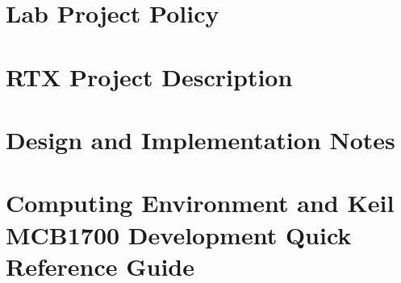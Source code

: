 \mainmatter

\part{Lab Project Policy}
\label{part_policy}


\part{RTX Project Description}
\label{part_proj_description}


\part{Design and Implementation Notes}
\label{part_faq}


\part{Computing Environment and Keil MCB1700 Development Quick Reference Guide}
\label{part_keil_dev}







\appendix



